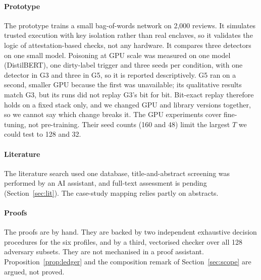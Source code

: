 \paragraph{Prototype}
The prototype trains a small bag-of-words network on 2,000 reviews. It simulates trusted
execution with key isolation rather than real enclaves, so it validates the logic of
attestation-based checks, not any hardware. It compares three detectors on one small model. Poisoning at GPU scale was
measured on one model (DistilBERT), one dirty-label trigger and three seeds per condition,
with one detector in G3 and three in G5, so it is reported descriptively. G5 ran on a second,
smaller GPU because the first was unavailable; its qualitative results match G3, but its runs
did not replay G3's bit for bit. Bit-exact replay therefore holds on a fixed stack only, and
we changed GPU and library versions together, so we cannot say which change breaks it. The
GPU experiments cover fine-tuning, not pre-training.
Their seed counts (160 and 48) limit the largest $T$ we could test to 128 and 32.

\paragraph{Literature}
The literature search used one database, title-and-abstract screening was performed by an
AI assistant, and full-text assessment is pending (Section~\ref{sec:lit}). The case-study
mapping relies partly on abstracts.

\paragraph{Proofs}
The proofs are by hand. They are backed by two independent exhaustive decision procedures
for the six profiles, and by a third, vectorised checker over all 128 adversary subsets. They
are not mechanised in a proof assistant. Proposition~\ref{prop:ledger} and the composition
remark of Section~\ref{sec:scope} are argued, not proved.
